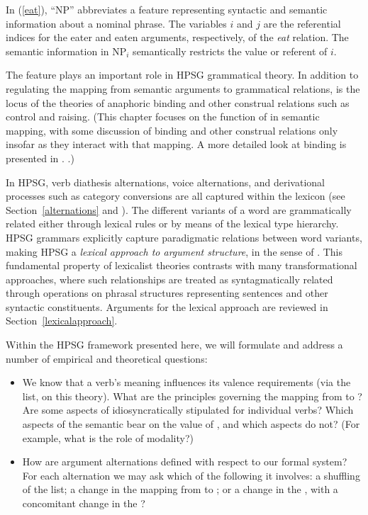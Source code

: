 \documentclass[output=paper
 	        ,biblatex
                ,babelshorthands
                ,newtxmath
                ,draftmode
                ,colorlinks, citecolor=brown
]{langscibook}
\begin{document}
	
\noindent
In (\ref{eat}), ``NP'' abbreviates a feature  representing syntactic and semantic information about a nominal phrase.  The variables $i$ and 
$j$ are the referential indices for the eater and eaten arguments, respectively, of the \textit{eat} relation.  The semantic information in 
NP$_i$ semantically restricts the value or referent of $i$. 

The \argst feature plays an important  
role in HPSG grammatical theory.  In addition to regulating the mapping from semantic arguments to
grammatical relations, \argst is the locus of the theories of anaphoric binding and other construal
relations such as control and raising.  (This chapter focuses on the function of \argst  in semantic
mapping, with some discussion of binding and other construal relations only insofar as they interact
with that mapping.  A more detailed look at binding is presented in
. .)   

In HPSG, verb diathesis alternations, voice alternations, and derivational processes such as category conversions are all captured within the lexicon (see Section~\ref{alternations} and ).  The different variants of a word are grammatically related either through lexical rules or by means of the lexical type hierarchy.  HPSG grammars explicitly capture paradigmatic relations between word variants, making HPSG a \textit{lexical approach to argument structure}, in the sense of \citet{MWArgSt}.
This fundamental property of lexicalist theories contrasts with many transformational approaches, where such relationships are treated as syntagmatically related through operations on phrasal structures representing sentences and other syntactic constituents.  Arguments for the lexical approach are reviewed in Section~\ref{lexicalapproach}.  

Within the HPSG framework presented here, we will formulate and address a number of empirical and theoretical questions: 

\begin{itemize}
\item We know that a verb's meaning influences its valence requirements (via the \argst list, on this theory). 
 What are the principles governing the mapping from \content to \argst?  Are some aspects of \argst idiosyncratically stipulated for individual verbs?  Which aspects of the semantic \content  bear on the value of \argst, and which aspects do not?  (For example, what is the role of modality?)  
\item How are argument alternations defined with respect to our formal system?  For each alternation
  we may ask which of the following it involves: a shuffling of the \argst list;  a change in the
  mapping from \argst to ; or  a change in the \content, with a concomitant change in the \argst?  
\end{itemize}
\end{document}
